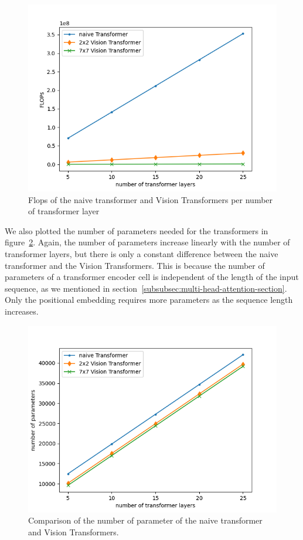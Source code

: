 \documentclass[a4paper]{scrartcl}
\begin{document}
    \begin{figure}[btp]
        \centering
        \includegraphics[width=0.8\linewidth]{img/plots/flops}
        \caption[Flops of the naive transformer and Vision Transformers]{Flops of the naive transformer and Vision Transformers per number of transformer layer}
        \label{fig:flops-naive-patch}
    \end{figure}

    We also plotted the number of parameters needed for the transformers in figure~\ref{fig:num-params-naive-patch}.
    Again, the number of parameters increase linearly with the number of transformer layers, but there is only a constant difference between the naive transformer and the Vision Transformers.
    This is because the number of parameters of a transformer encoder cell is independent of the length of the input sequence, as we mentioned in section~\ref{subsubsec:multi-head-attention-section}.
    Only the positional embedding requires more parameters as the sequence length increases.

    \begin{figure}[btp]
        \centering
        \includegraphics[width=0.8\linewidth]{img/plots/num_params}
        \caption[Number of parameters of the naive transformer and Vision Transformers]{Comparison of the number of parameter of the naive transformer and Vision Transformers.}
        \label{fig:num-params-naive-patch}
    \end{figure}
\end{document}
